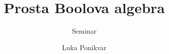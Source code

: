 \documentclass{beamer}
\title{Prosta Boolova algebra}
\subtitle{Seminar}
\author{Luka Ponikvar}
\institute [FMF] {Fakulteta za matematiko in fiziko}
\date{}
\begin{document}
  

\begin{frame}
 \titlepage
\end{frame}

  


  
\end{document}
